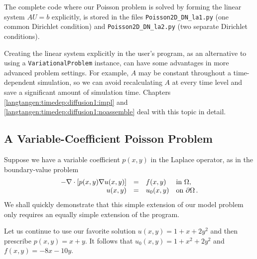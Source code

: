 The complete code where our Poisson problem is solved by forming
the linear system $AU=b$ explicitly, is stored in the files
{\fontsize{12pt}{12pt}\verb!Poisson2D_DN_la1.py!} (one common Dirichlet condition) and
{\fontsize{12pt}{12pt}\verb!Poisson2D_DN_la2.py!} (two separate Dirichlet conditions).

Creating the linear system
explicitly in the user's program, as an alternative to
using a {\fontsize{12pt}{12pt}\texttt{VariationalProblem}} instance, can have some advantages in more
advanced problem settings. For example, $A$ may be constant throughout
a time-dependent simulation, so we can avoid recalculating $A$ at
every time level and save a significant amount of simulation time.
Chapters \ref{langtangen:timedep:diffusion1:impl} and
\ref{langtangen:timedep:diffusion1:noassemble} deal with this topic in detail.



\subsection{A Variable-Coefficient Poisson Problem}
\label{langtangen:possion:2D:varcoeff}

Suppose we have a variable coefficient $p(x,y)$ in the Laplace operator,
as in the boundary-value problem
\begin{equation} \label{langtangen:poisson:2D:varcoeff}
  \begin{array}{rcll}
    - \nabla\cdot \left\lbrack
p(x,y)\nabla u(x,y)\right\rbrack &=& f(x,y) &\mbox{in } \Omega, \\
    u(x,y) &=& u_0(x,y) &\mbox{on } \partial\Omega\thinspace .
  \end{array}
\end{equation}
We shall quickly demonstrate that this simple extension of our model
problem only requires an equally simple extension of the \fenics{} program.

Let us continue to use our favorite solution $u(x,y)=1+x+2y^2$ and
then prescribe $p(x,y)=x+y$. It follows that
$u_0(x,y) = 1 + x^2 + 2y^2$ and $f(x,y)=-8x-10y$.

